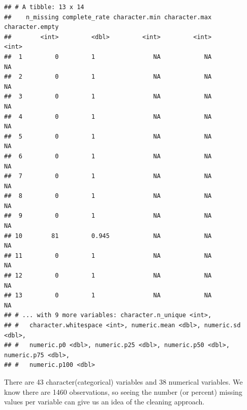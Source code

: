 \documentclass[
]{article}
\begin{document}
\begin{verbatim}
## # A tibble: 13 x 14
##    n_missing complete_rate character.min character.max character.empty
##        <int>         <dbl>         <int>         <int>           <int>
##  1         0         1                NA            NA              NA
##  2         0         1                NA            NA              NA
##  3         0         1                NA            NA              NA
##  4         0         1                NA            NA              NA
##  5         0         1                NA            NA              NA
##  6         0         1                NA            NA              NA
##  7         0         1                NA            NA              NA
##  8         0         1                NA            NA              NA
##  9         0         1                NA            NA              NA
## 10        81         0.945            NA            NA              NA
## 11         0         1                NA            NA              NA
## 12         0         1                NA            NA              NA
## 13         0         1                NA            NA              NA
## # ... with 9 more variables: character.n_unique <int>,
## #   character.whitespace <int>, numeric.mean <dbl>, numeric.sd <dbl>,
## #   numeric.p0 <dbl>, numeric.p25 <dbl>, numeric.p50 <dbl>, numeric.p75 <dbl>,
## #   numeric.p100 <dbl>
\end{verbatim}

There are 43 character(categorical) variables and 38 numerical
variables. We know there are 1460 observations, so seeing the number (or
percent) missing values per variable can give us an idea of the cleaning
approach.
\end{document}
